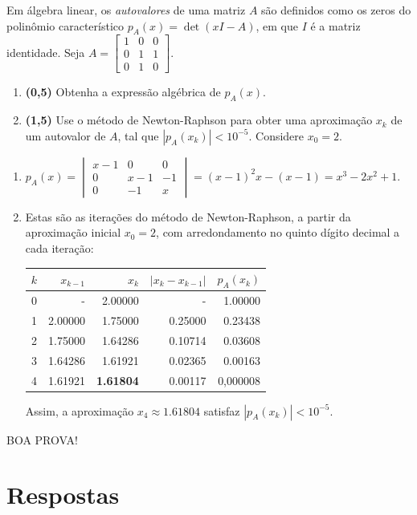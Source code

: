 \documentclass[12pt,a4paper]{article}
\begin{document}
\begin{ExerciseList}
\Exercise%
Em álgebra linear, os \textit{autovalores} de uma matriz $A$ são definidos como os zeros do polinômio característico $
p_A(x) = \det{(xI - A)}$, em que $I$ é a matriz identidade. Seja $A =
\begin{bmatrix}
1 & 0 & 0 \\
0 & 1 & 1 \\
0 & 1 & 0
\end{bmatrix}$.
\begin{enumerate}
\item \textbf{(0,5)} Obtenha a expressão algébrica de $p_A(x)$.
\item \textbf{(1,5)} Use o método de Newton-Raphson para obter uma aproximação $x_k$ de um autovalor de $A$, tal que $| p_A(x_k) | < 10^{-5}$. Considere $x_0 = 2$.
\end{enumerate}
\Answer
\begin{enumerate}
\item $p_A(x) =
\begin{vmatrix}
x - 1 &     0 &  0 \\
    0 & x - 1 & -1 \\
    0 &    -1 &  x
\end{vmatrix}
=
(x-1)^2 x - (x-1)
=
x^3 - 2 x^2 + 1$.
\item Estas são as iterações do método de Newton-Raphson, a partir da aproximação inicial $x_0 = 2$, com arredondamento no quinto dígito decimal a cada iteração:

\begin{center}
\begin{tabular}{|r|r|r|r|r|}
\hline
$k$ &  $x_{k-1}$ &  $x_k$ & $|x_k - x_{k-1}|$ & $p_A(x_k)$ \\
\hline
0 &       - & 2.00000 &       - & 1.00000 \\
\hline
1 & 2.00000 & 1.75000 & 0.25000 & 0.23438 \\
\hline
2 & 1.75000 & 1.64286 & 0.10714 & 0.03608 \\
\hline
3 & 1.64286 & 1.61921 & 0.02365 & 0.00163 \\
\hline
4 & 1.61921 & \textbf{1.61804} & 0.00117 & 0,000008 \\
\hline
\end{tabular}
\end{center}
Assim, a aproximação $x_4 \approx 1.61804$ satisfaz $| p_A(x_k) | < 10^{-5}$.
\end{enumerate}
\end{ExerciseList}

\begin{center}
BOA PROVA!
\end{center}

\newpage
\restoregeometry
\section*{Respostas}
\shipoutAnswer
\end{document}
